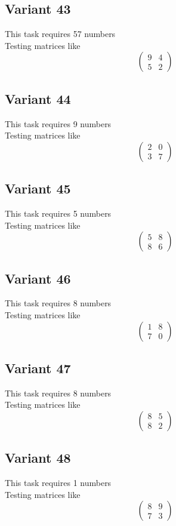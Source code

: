 \documentclass[11pt]{article}
\begin{document}
\subsection*{Variant 43}
This task requires 57 numbers\\
Testing matrices like \[ \begin{pmatrix} 9 & 4\\ 5 & 2 \end{pmatrix} \]

\subsection*{Variant 44}
This task requires 9 numbers\\
Testing matrices like \[ \begin{pmatrix} 2 & 0\\ 3 & 7 \end{pmatrix} \]

\subsection*{Variant 45}
This task requires 5 numbers\\
Testing matrices like \[ \begin{pmatrix} 5 & 8\\ 8 & 6 \end{pmatrix} \]

\subsection*{Variant 46}
This task requires 8 numbers\\
Testing matrices like \[ \begin{pmatrix} 1 & 8\\ 7 & 0 \end{pmatrix} \]

\subsection*{Variant 47}
This task requires 8 numbers\\
Testing matrices like \[ \begin{pmatrix} 8 & 5\\ 8 & 2 \end{pmatrix} \]

\subsection*{Variant 48}
This task requires 1 numbers\\
Testing matrices like \[ \begin{pmatrix} 8 & 9\\ 7 & 3 \end{pmatrix} \]
\end{document}
